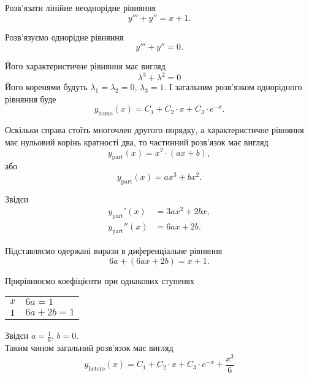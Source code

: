 \begin{example}
	Розв’язати лінійне неоднорідне рівняння \[y''' + y'' = x + 1.\]
\end{example}

\begin{solution}
	Розв’язуємо однорідне рівняння
	\begin{equation*}
		y''' + y'' = 0.
	\end{equation*}

	Його характеристичне рівняння має вигляд
	\begin{equation*}
		\lambda^3 + \lambda^2 = 0
	\end{equation*}
	Його коренями будуть $\lambda_1 = \lambda_2 = 0$, $\lambda_3 = 1$. І загальним роз\-в'яз\-ком однорідного рівняння буде
	\begin{equation*}
		y_{\text{homo}}(x) = C_1 + C_2 \cdot x + C_3 \cdot e^{-x}.
	\end{equation*}

	Оскільки справа стоїть многочлен другого порядку, а характеристичне рівняння має нульовий корінь кратності два, то частинний розв’язок має вигляд 
	\begin{equation*}
		y_{\text{part}}(x) = x^2 \cdot (a x + b),
	\end{equation*}
	або
	\begin{equation*}
		y_{\text{part}}(x) = a x^3 + b x^2.
	\end{equation*}

	Звідси
	\begin{align*}
		y_{\text{part}}'(x) &= 3 a x^2 + 2 b x, \\
		y_{\text{part}}''(x) &= 6 a x + 2 b.
	\end{align*}

	Підставляємо одержані вирази в диференціальне рівняння
	\begin{equation*}
		6 a + (6 a x + 2 b) = x + 1.
	\end{equation*}

	Прирівнюємо коефіцієнти при однакових ступенях
	\begin{table}[H]
		\centering
		\begin{tabular}{c|l}
			$x$ & $6 a = 1$ \\
			$1$ & $6 a + 2 b = 1$
		\end{tabular}
	\end{table}

	Звідси $a = \frac16$, $b = 0$. \\

	Таким чином загальний розв’язок має вигляд
	\begin{equation*}
		y_{\text{hetero}}(x) = C_1 + C_2 \cdot x + C_3 \cdot e^{-x} + \frac{x^3}{6}
	\end{equation*}
\end{solution}

